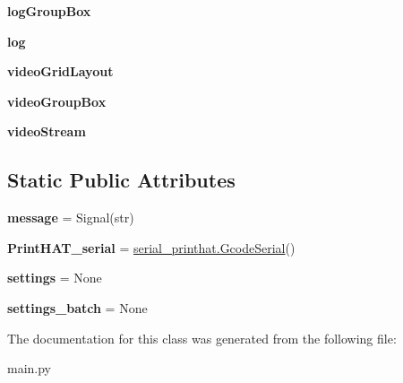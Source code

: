 \begin{DoxyCompactItemize}
\item 
{\bfseries log\+Group\+Box}\hypertarget{classmain_1_1_main_window_a579eb24161cf122c768a94bb7aab4e9b}{}\label{classmain_1_1_main_window_a579eb24161cf122c768a94bb7aab4e9b}

\item 
{\bfseries log}\hypertarget{classmain_1_1_main_window_ab242000205fece5684ca25792ea01091}{}\label{classmain_1_1_main_window_ab242000205fece5684ca25792ea01091}

\item 
{\bfseries video\+Grid\+Layout}\hypertarget{classmain_1_1_main_window_ab3e8fcc5a6431ff01a4831d990d6cfa6}{}\label{classmain_1_1_main_window_ab3e8fcc5a6431ff01a4831d990d6cfa6}

\item 
{\bfseries video\+Group\+Box}\hypertarget{classmain_1_1_main_window_a91c103383e263695a268b582a501dc9f}{}\label{classmain_1_1_main_window_a91c103383e263695a268b582a501dc9f}

\item 
{\bfseries video\+Stream}\hypertarget{classmain_1_1_main_window_ad4da7c9249d2be9f7932580c811c1524}{}\label{classmain_1_1_main_window_ad4da7c9249d2be9f7932580c811c1524}

\end{DoxyCompactItemize}
\subsection*{Static Public Attributes}
\begin{DoxyCompactItemize}
\item 
{\bfseries message} = Signal(str)\hypertarget{classmain_1_1_main_window_a960ee91dc0975d9a75f899fac2b151d4}{}\label{classmain_1_1_main_window_a960ee91dc0975d9a75f899fac2b151d4}

\item 
{\bfseries Print\+H\+A\+T\+\_\+serial} = \hyperlink{classserial__printhat_1_1_gcode_serial}{serial\+\_\+printhat.\+Gcode\+Serial}()\hypertarget{classmain_1_1_main_window_af020947ae8a3a5f1bd978bb4f42934c0}{}\label{classmain_1_1_main_window_af020947ae8a3a5f1bd978bb4f42934c0}

\item 
{\bfseries settings} = None\hypertarget{classmain_1_1_main_window_a3c4bd8f7b4c501bee603a93207219660}{}\label{classmain_1_1_main_window_a3c4bd8f7b4c501bee603a93207219660}

\item 
{\bfseries settings\+\_\+batch} = None\hypertarget{classmain_1_1_main_window_a18f8a155a3fca9b3dada8a7d11c8674e}{}\label{classmain_1_1_main_window_a18f8a155a3fca9b3dada8a7d11c8674e}

\end{DoxyCompactItemize}


The documentation for this class was generated from the following file\+:\begin{DoxyCompactItemize}
\item 
main.\+py\end{DoxyCompactItemize}

